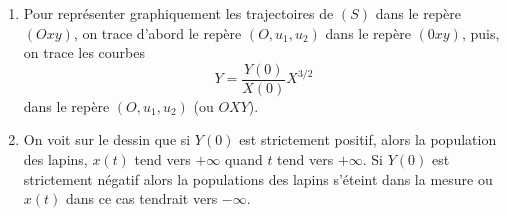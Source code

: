 {{\begin {enumerate}
  \item  Pour repr\'esenter graphiquement les trajectoires de $(S)$ dans le rep\`ere $(Oxy)$, on trace d'abord le rep\`ere $(O, u_1,u_2)$ dans le rep\`ere $(0xy)$, puis, on trace les courbes $$Y={\frac{Y(0)}{X(0)}}X^{3/2}$$
dans le rep\`ere $(O, u_1,u_2)$ (ou $OXY$).

  \item On voit sur le dessin que si $Y(0)$ est strictement positif, alors la population des lapins, $x(t)$ tend vers $+\infty$ quand $t$ tend vers $+\infty$. Si $Y(0)$ est strictement n\'egatif alors la populations des lapins s'\'eteint dans la mesure ou $x(t)$ dans ce cas tendrait vers $-\infty$.
\end {enumerate}
}
}
